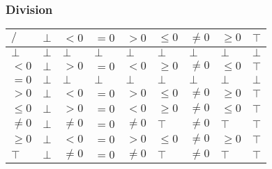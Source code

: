 \documentclass{beamer}
\begin{document}
        \begin{frame}
            \frametitle{Division}
        \begin{table}[]
            \begin{tabular}{|l|l|l|l|l|l|l|l|l|}
            \hline
            $/$     & $\bot$ & $<0$    & $=0$   & $>0$    & $\le 0$ & $\ne 0$ & $\ge 0$ & $\top$ \\ \hline
            $\bot$  & $\bot$ & $\bot$  & $\bot$ & $\bot$  & $\bot$  & $\bot$  & $\bot$  & $\bot$ \\ \hline
            $<0$    & $\bot$ & $>0$    & $=0$   & $<0$    & $\ge 0$ & $\ne 0$ & $\le 0$ & $\top$ \\ \hline
            $=0$    & $\bot$ & $\bot$  & $\bot$ & $\bot$  & $\bot$  & $\bot$  & $\bot$  & $\bot$ \\ \hline
            $>0$    & $\bot$ & $<0$    & $=0$   & $>0$    & $\le 0$ & $\ne 0$ & $\ge 0$ & $\top$ \\ \hline
            $\le 0$ & $\bot$ & $>0$    & $=0$   & $<0$    & $\ge 0$ & $\ne 0$ & $\le 0$ & $\top$ \\ \hline
            $\ne 0$ & $\bot$ & $\ne 0$ & $=0$   & $\ne 0$ & $\top$  & $\ne 0$ & $\top$  & $\top$ \\ \hline
            $\ge 0$ & $\bot$ & $<0$    & $=0$   & $>0$    & $\le 0$ & $\ne 0$ & $\ge 0$ & $\top$ \\ \hline
            $\top$  & $\bot$ & $\ne 0$ & $=0$   & $\ne 0$ & $\top$  & $\ne 0$ & $\top$  & $\top$ \\ \hline
            \end{tabular}
            \end{table}
        \end{frame}
\end{document}
